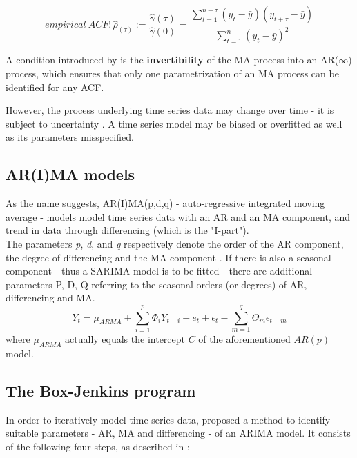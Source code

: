 \documentclass[a4paper, 11pt]{article}
\begin{document}
\begin{equation}
empirical \ ACF: \hat{\rho}_(\tau) := \frac{\hat{\gamma}(\tau)}{\hat{\gamma}(0)} = \frac{\sum_{t = 1}^{n - \tau}(y_{t} - \bar{y})(y_{t + \tau}-\bar{y})}{\sum_{t = 1}^{n}(y_{t}-\bar{y})^2}
\end{equation}

A condition introduced by \cite{Box.1976} is the \textbf{invertibility} of the MA process into an AR($\infty$) process, which ensures that only one parametrization of an MA process can be identified for any ACF.

However, the process underlying time series data may change over time - it is subject to uncertainty \citep{Adhikari.2015}. A time series model may be biased or overfitted as well as its parameters misspecified. \\

\subsection{AR(I)MA models}

As the name suggests, AR(I)MA(p,d,q) - auto-regressive integrated moving average - models model time series data with an AR and an MA component, and trend in data through differencing (which is the "I-part"). \\
The parameters \textit{p}, \textit{d}, and \textit{q} respectively denote the order of the AR component, the degree of differencing and the MA component \citep{Zhao.07022018}.
If there is also a seasonal component - thus a SARIMA model is to be fitted - there are additional parameters P, D, Q referring to the seasonal orders (or degrees) of AR, differencing and MA.\\

\begin{equation}
Y_{t} =  \mu_{ARMA} +  \sum_{i = 1}^{p}\Phi_{i}Y_{t-i} + e_{t}  + \epsilon_{t} - \sum_{m = 1}^{q} \Theta_{m}\epsilon_{t-m} 
\end{equation}
where $\mu_{ARMA}$ actually equals the intercept $C$ of the aforementioned $AR(p)$ model.

\subsection{The Box-Jenkins program}
In order to iteratively model time series data, \citep{Box.1976} proposed a method to identify suitable parameters - AR, MA and differencing - of an ARIMA model. It consists of the following four steps, as described in \cite{Falk.2012}: \\
\end{document}
